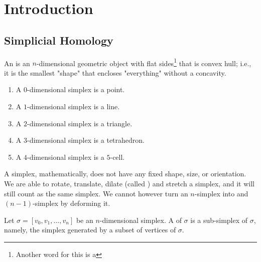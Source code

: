 \chapter{Introduction}\label{chapter:introduction}


\section{Simplicial Homology}\label{sec:simplicial-homology-sec}
    \begin{definition}\label{def:simplex}
        An  is an $n$-dimensional geometric object with flat sides\footnote{Another word for this is a } that is convex hull; i.e., it is the smallest "shape" that encloses "everything" without a concavity.
    \end{definition}

    \begin{example}
        \phantom{a}
        \begin{enumerate}
            \item A $0$-dimensional simplex is a point.
            \item A $1$-dimensional simplex is a line.
            \item A $2$-dimensional simplex is a triangle.
            \item A $3$-dimensional simplex is a tetrahedron.
            \item A $4$-dimensional simplex is a $5$-cell.
        \end{enumerate}
    \end{example}

    \begin{note}
        A simplex, mathematically, does not have any fixed shape, size, or orientation. We are able to rotate, translate, dilate (called ) and stretch a simplex, and it will still count as the same simplex. We cannot however turn an $n$-simplex into and $(n-1)$-simplex by deforming it.
    \end{note}

    \begin{definition}\label{def:simplex-face}
        Let $\sigma = \left[v_0,v_1,...,v_n\right]$ be an $n$-dimensional simplex. A  of $\sigma$ is a sub-simplex of $\sigma$, namely, the simplex generated by a subset of vertices of $\sigma$.
    \end{definition}

